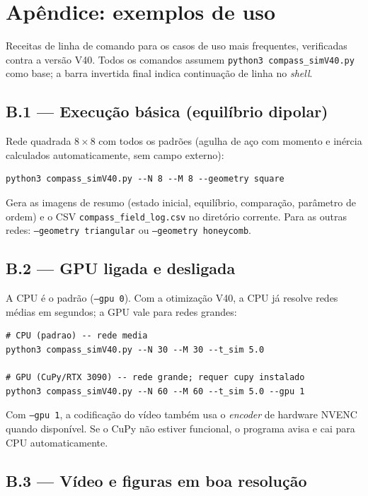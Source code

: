 \documentclass[11pt,a4paper]{article}
\newcommand{\code}[1]{\texttt{#1}}
\begin{document}
\section{Apêndice: exemplos de uso}
\label{app:exemplos}

Receitas de linha de comando para os casos de uso mais frequentes,
verificadas contra a versão V40. Todos os comandos assumem
\code{python3 compass\_simV40.py} como base; a barra invertida final
indica continuação de linha no \emph{shell}.

\subsection*{B.1 --- Execução básica (equilíbrio dipolar)}

Rede quadrada $8\times8$ com todos os padrões (agulha de aço com
momento e inércia calculados automaticamente, sem campo externo):
\begin{verbatim}
python3 compass_simV40.py --N 8 --M 8 --geometry square
\end{verbatim}
Gera as imagens de resumo (estado inicial, equilíbrio, comparação,
parâmetro de ordem) e o CSV \code{compass\_field\_log.csv} no diretório
corrente. Para as outras redes: \code{--geometry triangular} ou
\code{--geometry honeycomb}.

\subsection*{B.2 --- GPU ligada e desligada}

A CPU é o padrão (\code{--gpu 0}). Com a otimização V40, a CPU já
resolve redes médias em segundos; a GPU vale para redes grandes:
\begin{verbatim}
# CPU (padrao) -- rede media
python3 compass_simV40.py --N 30 --M 30 --t_sim 5.0

# GPU (CuPy/RTX 3090) -- rede grande; requer cupy instalado
python3 compass_simV40.py --N 60 --M 60 --t_sim 5.0 --gpu 1
\end{verbatim}
Com \code{--gpu 1}, a codificação do vídeo também usa o
\emph{encoder} de hardware NVENC quando disponível. Se o CuPy não
estiver funcional, o programa avisa e cai para CPU automaticamente.

\subsection*{B.3 --- Vídeo e figuras em boa resolução}
\end{document}
